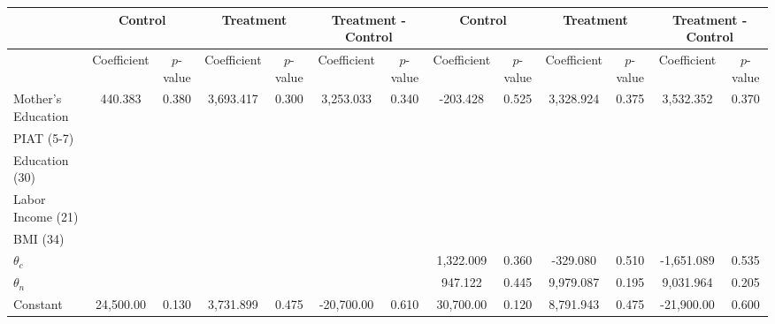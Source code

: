 \begin{tabular}{lcccccccccccc} \toprule
&\multicolumn{2}{c}{Control} & \multicolumn{2}{c}{Treatment} & \multicolumn{2}{c}{Treatment - Control} & \multicolumn{2}{c}{Control} & \multicolumn{2}{c}{Treatment} & \multicolumn{2}{c}{Treatment - Control} \\ \midrule
 & Coefficient  & $p$-value  & Coefficient  & $p$-value & Coefficient  & $p$-value  & Coefficient  & $p$-value  & Coefficient  & $p$-value  & Coefficient  & $p$-value \\ \midrule
Mother's Education &   440.383 &     0.380 &  3,693.417 &     0.300 &  3,253.033 &     0.340 &  -203.428 &     0.525 &  3,328.924 &     0.375 &  3,532.352 &     0.370 \\  
PIAT (5-7) &         &         &         &         &         &         &         &         &         &         &         &         \\
Education (30) &         &         &         &         &         &         &         &         &         &         &         &         \\
Labor Income (21) &         &         &         &         &         &         &         &         &         &         &         &         \\
BMI (34) &         &         &         &         &         &         &         &         &         &         &         &         \\
$\theta_{c}$ &         &         &         &         &         &         &  1,322.009 &     0.360 &  -329.080 &     0.510 & -1,651.089 &     0.535 \\  
$\theta_{n}$ &         &         &         &         &         &         &   947.122 &     0.445 &  9,979.087 &     0.195 &  9,031.964 &     0.205 \\  
Constant  & 24,500.00 &     0.130 &  3,731.899 &     0.475 & -20,700.00 &     0.610 & 30,700.00 &     0.120 &  8,791.943 &     0.475 & -21,900.00 &     0.600 \\  
\bottomrule \end{tabular}
